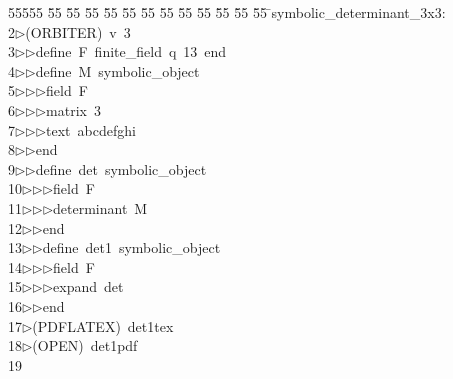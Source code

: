 %
%
\begin{tabbing}
55555 \= 55 \= 55 \= 55 \= 55 \= 55 \= 55 \= 55 \= 55 \= 55 \= 55 \= 55 \= 55 \= \>symbolic\_determinant\_3x3:\\[0pt]
2\>$\triangleright$\>(ORBITER)\ v\ 3\ \\[0pt]
3\>$\triangleright$\>$\triangleright$\>define\ F\ finite\_field\ q\ 13\ end\ \\[0pt]
4\>$\triangleright$\>$\triangleright$\>define\ M\ symbolic\_object\ \\[0pt]
5\>$\triangleright$\>$\triangleright$\>$\triangleright$\>field\ F\ \\[0pt]
6\>$\triangleright$\>$\triangleright$\>$\triangleright$\>matrix\ 3\ \\[0pt]
7\>$\triangleright$\>$\triangleright$\>$\triangleright$\>text\ abcdefghi\ \\[0pt]
8\>$\triangleright$\>$\triangleright$\>end\ \\[0pt]
9\>$\triangleright$\>$\triangleright$\>define\ det\ symbolic\_object\ \\[0pt]
10\>$\triangleright$\>$\triangleright$\>$\triangleright$\>field\ F\ \\[0pt]
11\>$\triangleright$\>$\triangleright$\>$\triangleright$\>determinant\ M\ \\[0pt]
12\>$\triangleright$\>$\triangleright$\>end\ \\[0pt]
13\>$\triangleright$\>$\triangleright$\>define\ det1\ symbolic\_object\ \\[0pt]
14\>$\triangleright$\>$\triangleright$\>$\triangleright$\>field\ F\ \\[0pt]
15\>$\triangleright$\>$\triangleright$\>$\triangleright$\>expand\ det\ \\[0pt]
16\>$\triangleright$\>$\triangleright$\>end\\[0pt]
17\>$\triangleright$\>(PDFLATEX)\ det1tex\\[0pt]
18\>$\triangleright$\>(OPEN)\ det1pdf\\[0pt]
19\>\end{tabbing}

